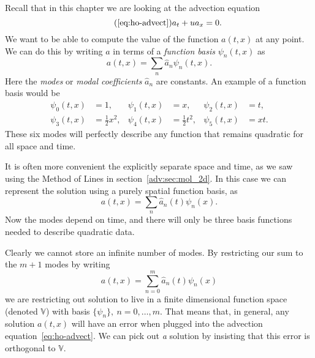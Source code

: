 Recall that in this chapter we are looking at the advection equation
%
\begin{equation}
  \tag{\ref{eq:ho-advect}}
  a_t + u a_x = 0.
\end{equation}
%
We want to be able to compute the value of the function $a(t, x)$ at any point.
We can do this by writing $a$ in terms of a \emph{function basis} $\psi_n(t, x)$
as
%
\begin{equation}
  \label{eq:dg_fn_basis}
  a(t, x) = \sum_n \hat{a}_n \psi_n(t, x).
\end{equation}
%
Here the \emph{modes} or \emph{modal coefficients} $\hat{a}_n$ are constants. An
example of a function basis would be
%
\begin{equation}
  \label{eq:dg_monomial_basis}
  \begin{aligned}
    \psi_{0}(t, x) &= 1, & \psi_{1}(t, x) &= x, & \psi_{2}(t, x) &= t, \\
    \psi_{3}(t, x) &= \tfrac{1}{2} x^2, & \psi_{4}(t, x) &= \tfrac{1}{2} t^2, &
    \psi_{5}(t, x) &= x t.
  \end{aligned}
\end{equation}
%
These six modes will perfectly describe any function that remains quadratic for
all space and time.

It is often more convenient the explicitly separate space and time, as we saw
using the Method of Lines in section~\ref{adv:sec:mol_2d}. In this case we can
represent the solution using a purely spatial function basis, as
%
\begin{equation}
  \label{eq:dg_fn_basis_split}
  a(t, x) = \sum_n \hat{a}_n(t) \psi_n(x).
\end{equation}
%
Now the modes depend on time, and there will only be three basis functions
needed to describe quadratic data.

Clearly we cannot store an infinite number of modes. By restricting our sum to
the $m+1$ modes by writing
%
\begin{equation}
  \label{eq:dg_fn_basis_split}
  a(t, x) = \sum_{n=0}^{m} \hat{a}_n(t) \psi_n(x)
\end{equation}
%
we are restricting out solution to live in a finite dimensional function space
(denoted $\mathbb{V}$) with basis $\{ \psi_n \}, \ n = 0, \dots, m$.
That means that, in general, any solution $a(t, x)$ will have an error when
plugged into the advection equation~\ref{eq:ho-advect}.
We can pick out \emph{a} solution by insisting that this error is orthogonal to
$\mathbb{V}$.

